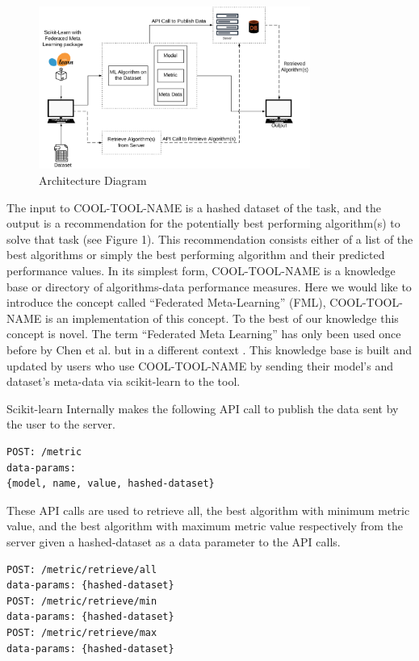 \documentclass{article}
\begin{document}
\begin{figure}[h]
    \centering
    \includegraphics[width=3.5in]{architecture-diagram.PNG}
    \caption{Architecture Diagram}
    \label{architecture-diagram}
\end{figure}

The input to COOL-TOOL-NAME is a hashed dataset of the task, and the output is a recommendation for the potentially best performing algorithm(s) to solve that task (see Figure 1). This recommendation consists either of a list of the best algorithms or simply the best performing algorithm and their predicted performance values. In its simplest form, COOL-TOOL-NAME is a knowledge base or directory of algorithms-data performance measures. Here we would like to introduce the concept called “Federated Meta-Learning” (FML), COOL-TOOL-NAME is an implementation of this concept. To the best of our knowledge this concept is novel. The term “Federated Meta Learning” has only been used once before by Chen et al. but in a different context \cite{chen-et-al}. This knowledge base is built and updated by users who use COOL-TOOL-NAME by sending their model’s and dataset’s meta-data via scikit-learn to the tool.

Scikit-learn Internally makes the following API call to publish the data sent by the user to the server.
\begin{lstlisting}
POST: /metric
data-params: 
{model, name, value, hashed-dataset}
\end{lstlisting}

These API calls are used to retrieve all, the best algorithm with minimum metric value, and the best algorithm with maximum metric value respectively from the server given a hashed-dataset as a data parameter to the API calls.
\begin{lstlisting}
POST: /metric/retrieve/all
data-params: {hashed-dataset}
POST: /metric/retrieve/min
data-params: {hashed-dataset}
POST: /metric/retrieve/max
data-params: {hashed-dataset}
\end{lstlisting}
\end{document}
